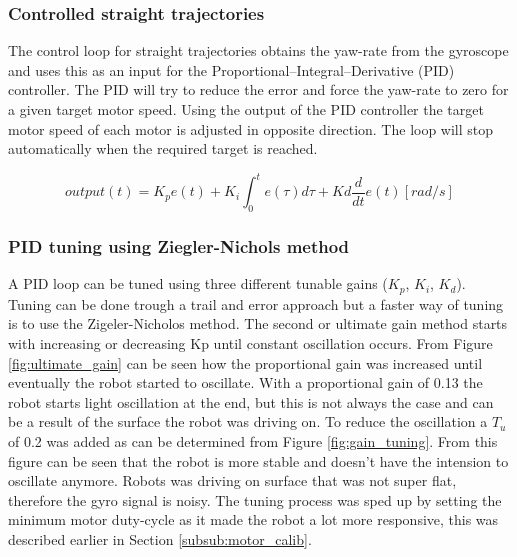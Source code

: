 \subsubsection{Controlled straight trajectories}


The control loop for straight trajectories obtains the yaw-rate from the gyroscope and uses this as an input for the Proportional–Integral–Derivative (PID) controller.
The PID will try to reduce the error and force the yaw-rate to zero for a given target motor speed.
Using the output of the PID controller the target motor speed of each motor is adjusted in opposite direction.
The loop will stop automatically when the required target is reached.

\begin{equation}
output(t) = K_{p}e(t) + K_{i} \int_{0}^{t}e(\tau)d\tau + Kd\frac{d}{dt}e(t) [rad/s]
\end{equation}

\subsubsection{PID tuning using Ziegler-Nichols method}


A PID loop can be tuned using three different tunable gains ($K_{p}$, $K_{i}$, $K_{d}$).
Tuning can be done trough a trail and error approach but a faster way of tuning is to use the Zigeler-Nicholos method.
The second or ultimate gain method starts with increasing or decreasing Kp until constant oscillation occurs.
From Figure \ref{fig:ultimate_gain} can be seen how the proportional gain was increased until eventually the robot started to oscillate.
With a proportional gain of 0.13 the robot starts light oscillation at the end, but this is not always the case and can be a result of the surface the robot was driving on.
To reduce the oscillation a $T_{u}$ of 0.2 was added as can be determined from Figure \ref{fig:gain_tuning}.
From this figure can be seen that the robot is more stable and doesn't have the intension to oscillate anymore.
Robots was driving on surface that was not super flat, therefore the gyro signal is noisy.
The tuning process was sped up by setting the minimum motor duty-cycle as it made the robot a lot more responsive, this was described earlier in Section \ref{subsub:motor_calib}.

